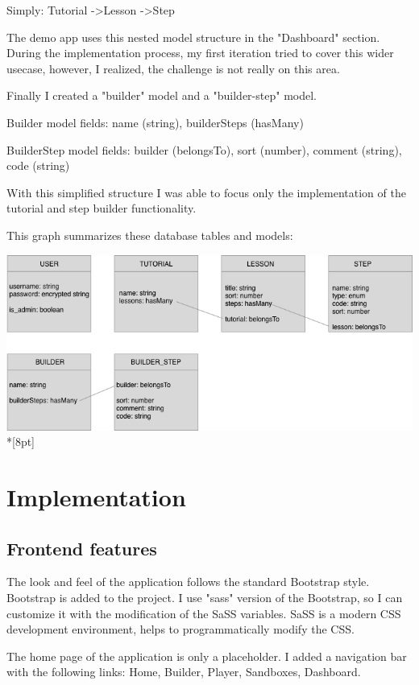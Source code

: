 \documentclass[12pt, a4paper, oneside, openright, medskipamount]{report}
\begin{document}
Simply: Tutorial -\textgreater Lesson -\textgreater Step

The demo app uses this nested model structure in the "Dashboard" section. During the implementation process, my first iteration tried to cover this wider usecase, however, I realized, the challenge is not really on this area.

Finally I created a "builder" model and a "builder-step" model.

Builder model fields: name (string), builderSteps (hasMany)

BuilderStep model fields: builder (belongsTo), sort (number), comment (string), code (string)

With this simplified structure I was able to focus only the implementation of the tutorial and step builder functionality.

This graph summarizes these database tables and models:

\includegraphics[width=1\textwidth]{assets/database-tables}\\*[8pt]


\chapter{Implementation}

\section{Frontend features}

The look and feel of the application follows the standard Bootstrap style. Bootstrap is added to the project. I use "sass" version of the Bootstrap, so I can customize it with the modification of the SaSS variables. SaSS is a modern CSS development environment, helps to programmatically modify the CSS.

The home page of the application is only a placeholder. I added a navigation bar with the following links: Home, Builder, Player, Sandboxes, Dashboard.
\end{document}
